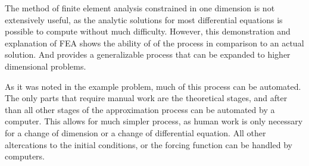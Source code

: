 \documentclass[10pt]{amsart}
\numberwithin{equation}{section}
\theoremstyle{definition}
\begin{document}
\begin{multicols}{2}
The method of finite element analysis constrained in one dimension is not
extensively useful, as the analytic solutions for most differential equations is
possible to compute without much difficulty. However, this demonstration and
explanation of FEA shows the ability of of the process in comparison to an
actual solution. And provides a generalizable process that can be expanded to
higher dimensional problems.

As it was noted in the example problem, much of this process can be automated.
The only parts that require manual work are the theoretical stages, and after
than all other stages of the approximation process can be automated by a
computer. This allows for much simpler process, as human work is only necessary
for a change of dimension or a change of differential equation. All other
altercations to the initial conditions, or the forcing function can be handled
by computers.

\end{multicols}

\newpage

\nocite{*}


\end{document}
